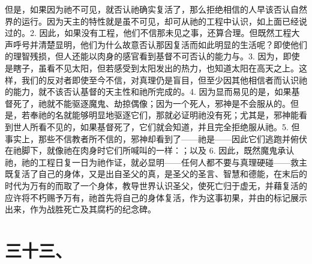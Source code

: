 但是，如果因为祂不可见，就否认祂确实复活了，那么拒绝相信的人早该否认自然界的运行。因为天主的特性就是虽不可见，却可从祂的工程中认识，如上面已经说过的。2. 因此，如果没有工程，他们不信那未见之事，还算合理。但既然工程大声呼号并清楚显明，他们为什么故意否认那因复活而如此明显的生活呢？即使他们的理智残损，但人还能以肉身的感官看到基督不可否认的能力与。3. 因为，即使是瞎子，虽看不见太阳，但若感受到太阳发出的热力，也知道太阳在高天之上。这样，我们的反对者即使至今不信，对真理仍是盲目，但至少因其他相信者而认识祂的能力，就不该否认基督的天主性和祂所完成的。4. 因为显而易见的是，如果基督死了，祂就不能驱逐魔鬼、劫掠偶像；因为一个死人，邪神是不会服从的。但是，若奉祂的名就能够明显地驱逐它们，那就必证明祂没有死；尤其是，邪神能看到世人所看不见的，如果基督死了，它们就会知道，并且完全拒绝服从祂。5. 但事实上，那些不信教者所不信的，邪神却看到了——祂是——因此它们逃跑并俯伏在祂脚下，就像祂在肉身时它们所喊叫的一样：；以及 6. 因此，既然魔鬼承认祂，祂的工程日复一日为祂作证，就必显明——任何人都不要与真理硬碰——救主既复活了自己的身体，又是出自圣父的真，是圣父的圣言、智慧和德能，在末后的时代为万有的而取了一个身体，教导世界认识圣父，使死亡归于虚无，并藉复活的应许将不朽赐予万有，祂首先将自己的身体复活，作为这事初果，并由的标记展示出来，作为战胜死亡及其腐朽的纪念碑。\par


\section{三十三、}

